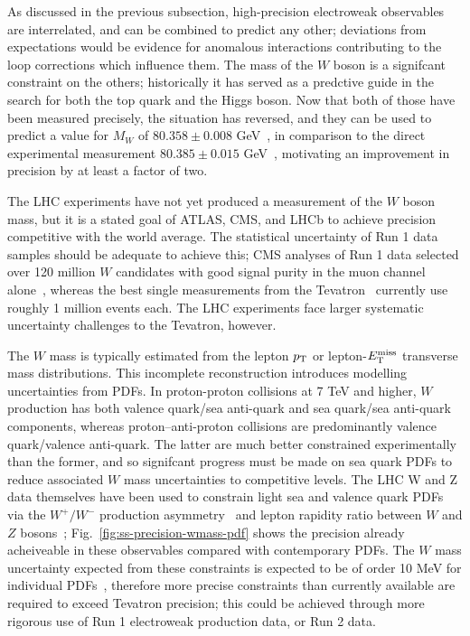 
As discussed in the previous subsection, high-precision electroweak
observables are interrelated, and can be combined to predict any
other; deviations from expectations would be evidence for anomalous
interactions contributing to the loop corrections which influence
them.  The mass of the $W$ boson is a signifcant constraint on the
others; historically it has served as a predctive guide in the search for
both the top quark and the Higgs boson.  Now that both of those have been
measured precisely, the situation has reversed, and they can be used
to predict a value for $M_W$ of $80.358 \pm 0.008$
GeV~\cite{Baak:2014ora}, in comparison to the direct experimental
measurement $80.385 \pm 0.015$ GeV~\cite{Aaltonen:2013iut}, motivating
an improvement in precision by at least a factor of two.

The LHC experiments have not yet produced a measurement of the $W$
boson mass, but it is a stated goal of ATLAS, CMS, and LHCb to achieve
precision competitive with the world average.  The statistical
uncertainty of Run 1 data samples should be adequate to achieve this;
CMS analyses of Run 1 data selected over 120 million $W$ candidates
with good signal purity in the muon channel
alone~\cite{Chatrchyan:2013mza,Khachatryan:2016pev},
whereas the best single measurements from the
Tevatron~\cite{Aaltonen:2012bp,Abazov:2012bv} currently use roughly 1
million events each.  The LHC experiments face larger systematic
uncertainty challenges to the Tevatron, however.

The $W$ mass is typically estimated from the lepton $p_{\mathrm{T}}$ or
lepton-$E_{\mathrm{T}}^{\mathrm{miss}}$ transverse mass distributions.  This incomplete
reconstruction introduces modelling uncertainties from PDFs. In
proton-proton collisions at 7 TeV and higher, $W$ production has both
valence quark/sea anti-quark and sea quark/sea anti-quark components,
whereas proton--anti-proton collisions are predominantly valence
quark/valence anti-quark.  The latter are much better constrained
experimentally than the former, and so signifcant progress must be
made on sea quark PDFs to reduce associated $W$ mass uncertainties to
competitive levels.  The LHC W and Z data themselves have been used to
constrain light sea and valence quark PDFs via the $W^+/W^-$
production
asymmetry~\cite{Khachatryan:2016pev,Aaij:2014wba,Chatrchyan:2013mza,Chatrchyan:2012xt,Aad:2011dm}
and lepton rapidity ratio between $W$ and $Z$
bosons~\cite{Aad:2011dm,Aad:2012sb};
Fig.~\ref{fig:ss-precision-wmass-pdf} shows the precision already
acheiveable in these observables compared with contemporary PDFs.  The
$W$ mass uncertainty expected from these constraints is expected to be
of order 10 MeV for individual PDFs~\cite{Bozzi:2015hha,Bozzi:2011ww},
therefore more precise constraints than currently available are
required to exceed Tevatron precision; this could be achieved through
more rigorous use of Run 1 electroweak production data, or Run 2 data.

